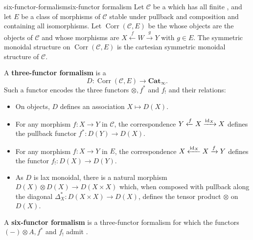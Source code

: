\begin{topic}{six-functor-formalism}{six-functor formalism}
    Let $\mathcal{C}$ be a  which has all finite , and let $E$ be a class of morphisms of $\mathcal{C}$ stable under pullback and composition and containing all isomorphisms.
    Let $\operatorname{Corr}(\mathcal{C}, E)$ be the   whose objects are the objects of $\mathcal{C}$ and whose morphisms are  $X \xleftarrow{f} W \xrightarrow{g} Y$ with $g \in E$. The symmetric monoidal structure on $\operatorname{Corr}(\mathcal{C}, E)$ is the cartesian symmetric monoidal structure of $\mathcal{C}$.

    A \textbf{three-functor formalism} is a 
    \[ D \colon \operatorname{Corr}(\mathcal{C}, E) \to \textbf{Cat}_\infty . \]
    Such a functor encodes the three functors $\otimes, f^*$ and $f_!$ and their relations:
    \begin{itemize}
        \item On objects, $D$ defines an association $X \mapsto D(X)$.
        \item For any morphism $f \colon X \to Y$ in $\mathcal{C}$, the correspondence $Y \xleftarrow{f} X \xrightarrow{\textup{id}_X} X$ defines the pullback functor $f^* \colon D(Y) \to D(X)$.
        \item For any morphism $f \colon X \to Y$ in $E$, the correspondence $X \xleftarrow{\textup{id}_X} X \xrightarrow{f} Y$ defines the functor $f_! \colon D(X) \to D(Y)$.
        \item As $D$ is lax monoidal, there is a natural morphism $D(X) \otimes D(X) \to D(X \times X)$ which, when composed with pullback along the diagonal $\Delta_X^* \colon D(X \times X) \to D(X)$, defines the tensor product $\otimes$ on $D(X)$.
    \end{itemize}
    A \textbf{six-functor formalism} is a three-functor formalism for which the functors $(-) \otimes A, f^*$ and $f_!$ admit .
\end{topic}

